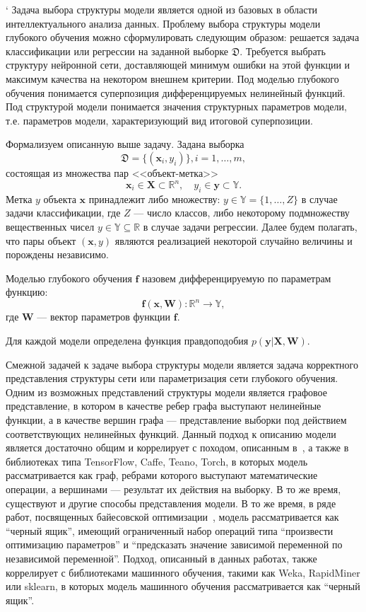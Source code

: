 `\newpage{}
Задача выбора структуры модели является одной из базовых в области интеллектуального анализа данных.
Проблему выбора структуры модели глубокого обучения можно сформулировать следующим образом: решается задача классификации или регрессии на заданной выборке $\mathfrak{D}$. Требуется выбрать структуру нейронной сети, доставляющей минимум ошибки на этой функции и максимум качества на некотором внешнем критерии.
 Под моделью глубокого обучения понимается суперпозиция дифференцируемых нелинейный функций. Под структурой модели понимается значения структурных параметров модели, т.е. параметров модели, характеризующий вид итоговой суперпозиции. 

Формализуем описанную выше задачу.
Задана выборка \begin{equation}\label{eq:dataset}\mathfrak{D} = \{(\mathbf{x}_i,y_i)\}, i = 1,\dots,m,\end{equation} состоящая из множества пар <<объект-метка>> $$\mathbf{x}_i \in \mathbf{X} \subset \mathbb{R}^n, \quad {y}_i \in \mathbf{y} \subset \mathbb{Y}.$$ Метка ${y}$  объекта $\mathbf{x}$ принадлежит либо множеству: ${y} \in \mathbb{Y} = \{1, \dots, Z\}$ в случае задачи классификации, где $Z$ --- число классов, либо некоторому подмножеству вещественных чисел ${y} \in \mathbb{Y}  \subseteq \mathbb{R}$ в случае задачи регрессии. Далее будем полагать, что пары объект $(\mathbf{x}, y)$ являются реализацией некоторой случайно величины и порождены независимо.


\begin{defin}
Моделью глубокого обучения $\mathbf{f}$ назовем дифференцируемую по параметрам функцию:
\[
    \mathbf{f}(\mathbf{x}, \mathbf{W}): \mathbb{R}^n \to \mathbb{Y},
\]
где $\mathbf{W}$ --- вектор параметров функции $\mathbf{f}$.
\end{defin}

Для каждой модели определена функция правдоподобия  $p(\mathbf{y}|\mathbf{X}, \mathbf{W})$.
 

Смежной задачей к задаче выбора структуры модели является задача корректного представления структуры сети или параметризация сети глубокого обучения. Одним из возможных представлений структуры модели является графовое представление, в котором в качестве ребер графа выступают нелинейные функции, а в качестве вершин графа --- представление выборки под действием соответствующих нелинейных функций. 
Данный подход к описанию модели является достаточно общим и коррелирует с походом, описанным в~\cite{vokov}, а также в библиотеках типа TensorFlow, Caffe, Teano, Torch, в которых модель рассматривается как граф, ребрами которого выступают математические операции, а вершинами --- результат их действия на выборку. 
 В то же время, существуют и другие способы представления модели. В то же время, в ряде работ, посвященных байесовской оптимизации~\cite{snoek_deep,rbf_surrogate,bo_gp}, модель рассматривается как ``черный ящик'', имеющий ограниченный набор операций типа ``произвести оптимизацию параметров'' и ``предсказать значение зависимой переменной по независимой переменной''.
Подход, описанный в данных работах, также коррелирует с  библиотеками машинного обучения, такими как Weka, RapidMiner или sklearn, в которых модель машинного обучения рассматривается как ``черный ящик''.

